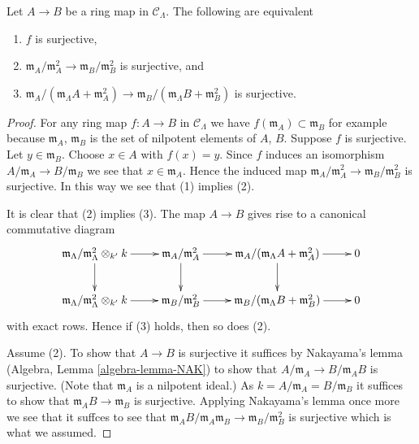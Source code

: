 \begin{lemma}
\label{lemma-surjective}
Let $A \to B$ be a ring map in $\mathcal{C}_\Lambda$.  
The following are equivalent
\begin{enumerate}
\item $f$ is surjective,
\item $\mathfrak m_A/\mathfrak m_A^2 \to \mathfrak m_B/\mathfrak m_B^2$
is surjective, and
\item $\mathfrak m_A/(\mathfrak m_\Lambda A + \mathfrak m_A^2)
\to \mathfrak m_B/(\mathfrak m_\Lambda B + \mathfrak m_B^2)$ is surjective.
\end{enumerate}
\end{lemma}

\begin{proof}
For any ring map $f : A \to B$ in $\mathcal{C}_\Lambda$ we have
$f(\mathfrak m_A) \subset \mathfrak m_B$ for example because
$\mathfrak m_A$, $\mathfrak m_B$ is the set of nilpotent elements of
$A$, $B$. Suppose $f$ is surjective. Let $y \in \mathfrak m_B$.
Choose $x \in A$ with $f(x) = y$. Since $f$ induces an isomorphism
$A/\mathfrak m_A \to B/\mathfrak m_B$ we see that $x \in \mathfrak m_A$.
Hence the induced map
$\mathfrak m_A/\mathfrak m_A^2 \to \mathfrak m_B/\mathfrak m_B^2$
is surjective. In this way we see that (1) implies (2).

\medskip\noindent
It is clear that (2) implies (3). The map $A \to B$ gives rise
to a canonical commutative diagram
$$
\xymatrix{
\mathfrak m_\Lambda/\mathfrak m_\Lambda^2 \otimes_{k'} k \ar[r] \ar[d] &
\mathfrak m_A/\mathfrak m_A^2 \ar[r] \ar[d] &
\mathfrak m_A/(\mathfrak m_\Lambda A + \mathfrak m_A^2) \ar[r] \ar[d] & 0 \\
\mathfrak m_\Lambda/\mathfrak m_\Lambda^2 \otimes_{k'} k \ar[r] &
\mathfrak m_B/\mathfrak m_B^2 \ar[r] &
\mathfrak m_B/(\mathfrak m_\Lambda B + \mathfrak m_B^2) \ar[r] & 0
}
$$
with exact rows. Hence if (3) holds, then so does (2).

\medskip\noindent
Assume (2). To show that $A \to B$ is surjective it suffices by
Nakayama's lemma (Algebra, Lemma \ref{algebra-lemma-NAK})
to show that $A/\mathfrak m_A \to B/\mathfrak m_AB$ is surjective.
(Note that $\mathfrak m_A$ is a nilpotent ideal.)
As $k = A/\mathfrak m_A = B/\mathfrak m_B$ it suffices to show that
$\mathfrak m_AB \to \mathfrak m_B$ is surjective. Applying
Nakayama's lemma once more we see that it suffces to see that
$\mathfrak m_AB/\mathfrak m_A\mathfrak m_B \to \mathfrak m_B/\mathfrak m_B^2$
is surjective which is what we assumed.
\end{proof}

